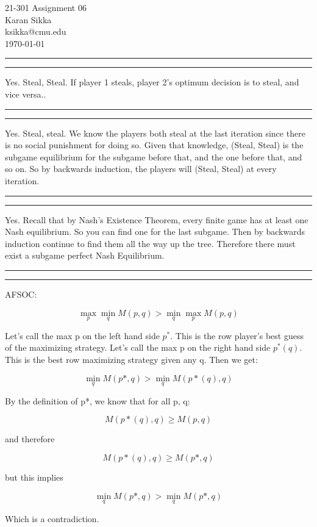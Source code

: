 \documentclass[11pt,letterpaper]{article}
\makeatletter
\newcommand{\question}[1] {\vspace{.25in} \hrule\vspace{0.5em}
\noindent{\bf #1} \vspace{0.5em}
\hrule \vspace{.10in}}
\newcommand{\myname}{Karan Sikka}
\newcommand{\myandrew}{ksikka@cmu.edu}
\newcommand{\myhwnum}{06}
\makeatother
\begin{document}
\medskip

\thispagestyle{plain}
\begin{center}                  %
{\Large 21-301 Assignment \myhwnum} \\
\myname \\
\myandrew \\
\today
\end{center}

\question{1.1}
Yes. Steal, Steal. If player 1 steals, player 2's optimum decision is to steal, and vice versa..

\question{1.2}
Yes. Steal, steal. We know the players both steal at the last iteration since there is no social punishment for doing so.
Given that knowledge, (Steal, Steal) is the subgame equilibrium for the subgame before that, and the one before that, and so on.
So by backwards induction, the players will (Steal, Steal) at every iteration.

\question{1.3}

Yes. Recall that by Nash's Existence Theorem, every finite game has at least one Nash equilibrium.
So you can find one for the last subgame. Then by backwards induction continue to find them all the way up the tree.
Therefore there must exist a subgame perfect Nash Equilibrium.

\question{2}

AFSOC:

$$\max_p \min_q M(p, q) > \min_q \max_p M(p, q)$$

Let's call the max p on the left hand side $p^*$. This is the row player's best guess of the maximizing strategy.
Let's call the max p on the right hand side $p^*(q)$. This is the best row maximizing strategy given any q. Then we get:

$$\min_q M(p*, q) > \min_q M(p*(q), q)$$

By the definition of p*, we know that for all p, q:

$$M(p*(q), q) \geq M(p, q)$$

and therefore

$$M(p*(q), q) \geq M(p*, q)$$

but this implies

$$\min_q M(p*, q) > \min_q M(p*, q)$$

Which is a contradiction.
\end{document}
